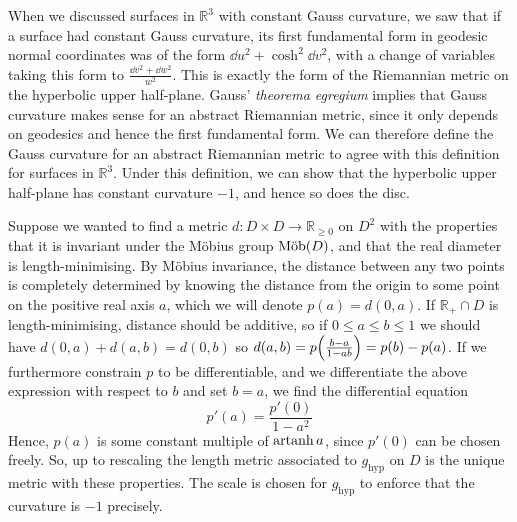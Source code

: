 \begin{remark}
	When we discussed surfaces in \( \mathbb R^3 \) with constant Gauss curvature, we saw that if a surface had constant Gauss curvature, its first fundamental form in geodesic normal coordinates was of the form \( \dd{u}^2 + \cosh^2 \dd{v}^2 \), with a change of variables taking this form to \( \frac{\dd{v}^2 + \dd{w}^2}{w^2} \).
	This is exactly the form of the Riemannian metric on the hyperbolic upper half-plane.
	Gauss' \textit{theorema egregium} implies that Gauss curvature makes sense for an abstract Riemannian metric, since it only depends on geodesics and hence the first fundamental form.
	We can therefore define the Gauss curvature for an abstract Riemannian metric to agree with this definition for surfaces in \( \mathbb R^3 \).
	Under this definition, we can show that the hyperbolic upper half-plane has constant curvature \( -1 \), and hence so does the disc.

	Suppose we wanted to find a metric \( d \colon D \times D \to \mathbb R_{\geq 0} \) on \( D^2 \) with the properties that it is invariant under the M\"obius group \( \text{M\"ob}(D) \), and that the real diameter is length-minimising.
	By M\"obius invariance, the distance between any two points is completely determined by knowing the distance from the origin to some point on the positive real axis \( a \), which we will denote \( p(a) = d(0,a) \).
	If \( \mathbb R_+ \cap D \) is length-minimising, distance should be additive, so if \( 0 \leq a \leq b \leq 1 \) we should have \( d(0,a) + d(a,b) = d(0,b) \) so \( d(a,b) = p\qty(\frac{b-a}{1-ab}) = p(b) - p(a) \).
	If we furthermore constrain \( p \) to be differentiable, and we differentiate the above expression with respect to \( b \) and set \( b = a \), we find the differential equation
	\[
		p'(a) = \frac{p'(0)}{1-a^2}
	\]
	Hence, \( p(a) \) is some constant multiple of \( \operatorname{artanh} a \), since \( p'(0) \) can be chosen freely.
	So, up to rescaling the length metric associated to \( g_{\text{hyp}} \) on \( D \) is the unique metric with these properties.
	The scale is chosen for \( g_{\text{hyp}} \) to enforce that the curvature is \( -1 \) precisely.
\end{remark}

